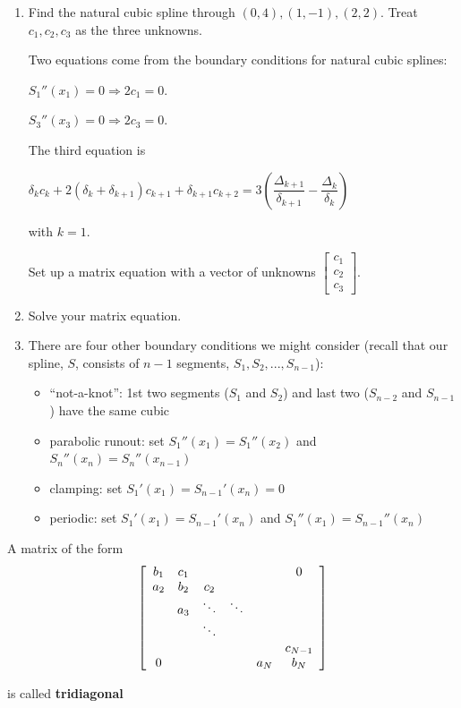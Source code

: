 \documentclass[12pt,letterpaper,noanswers]{exam}
\begin{document}
\begin{enumerate}[resume]
\item Find the natural cubic spline through $(0,4), (1,-1), (2,2)$.  Treat $c_1, c_2, c_3$ as the three unknowns.

Two equations come from the boundary conditions for natural cubic splines:

$S_1''(x_1) = 0 \Rightarrow 2c_1 = 0$.

$S_3''(x_3) = 0 \Rightarrow 2c_3 = 0$.

The third equation is

$\delta_k c_k + 2(\delta_k+\delta_{k+1})c_{k+1} + \delta_{k+1}c_{k+2} =3 \left(\dfrac{\Delta_{k+1}}{\delta_{k+1}} - \dfrac{\Delta_k}{\delta_k}\right)$

with $k = 1$.

Set up a matrix equation with a vector of unknowns $\left[\begin{array}{c} c_1 \\ c_2 \\ c_3 \end{array}\right]$.

\item Solve your matrix equation.


\item There are four other boundary conditions we might consider (recall that our spline, $S$, consists of $n-1$ segments, $S_1, S_2, ..., S_{n-1}$):
\begin{itemize}
 \item ``not-a-knot'': 1st two segments ($S_1$ and $S_2$) and last two ($S_{n-2}$ and $S_{n-1}$) have the same cubic
    \item parabolic runout: set $S_1''(x_1) = S_1''(x_2)$ and $S_n''(x_n) = S_n''(x_{n-1})$
    \item clamping: set $S_1'(x_1) = S_{n-1}'(x_n) = 0$
    \item periodic: set $S_1'(x_1) = S_{n-1}'(x_n)$ and $S_1''(x_1) = S_{n-1}''(x_n)$
\end{itemize}



\end{enumerate}








\begin{tcolorbox}
A matrix of the form \[\left[\begin{array}{ c c c c c c } 
b_1 & c_1 &  &  & & 0 \\
a_2 & b_2 & c_2 &  &  &  \\
 & a_3 & \ddots & \ddots &  &  \\
 &  &\ddots &  &  & \\
  &  & &  &  & c_{N-1}\\
0 & & & & a_N & b_N
\end{array}\right]\]

is called \textbf{tridiagonal}
\end{tcolorbox}
\end{document}
